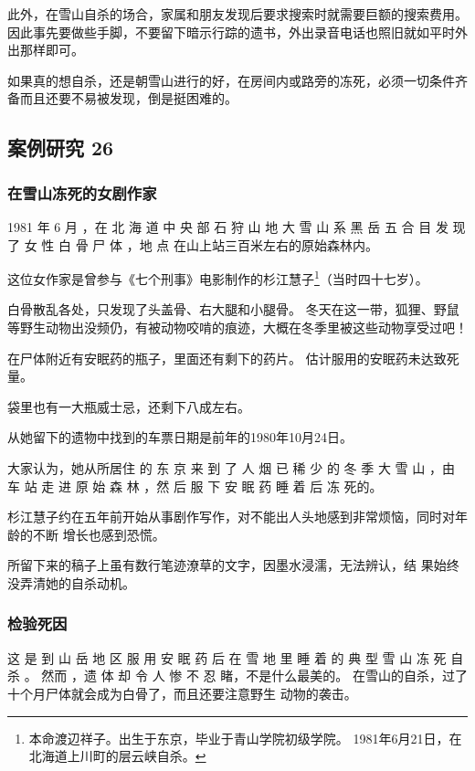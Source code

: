 \documentclass[UTF8]{ctexart}
\begin{document}
此外，在雪山自杀的场合，家属和朋友发现后要求搜索时就需要巨额的搜索费用。因此事先要做些手脚，不要留下暗示行踪的遗书，外出录音电话也照旧就如平时外出那样即可。

如果真的想自杀，还是朝雪山进行的好，在房间内或路旁的冻死，必须一切条件齐备而且还要不易被发现，倒是挺困难的。

\subsection{案例研究 26}

\subsubsection*{在雪山冻死的女剧作家}

1981 年 6 月 ，在 北 海 道 中 央 部 石 狩 山 地 大 雪 山 系 黑 岳 五 合 目 发 现 了 女 性 白 骨 尸 体 ，地 点 在山上站三百米左右的原始森林内。

这位女作家是曾参与《七个刑事》电影制作的杉江慧子\footnote{本命渡辺祥子。出生于东京，毕业于青山学院初级学院。 1981年6月21日，在北海道上川町的层云峡自杀。}（当时四十七岁）。

白骨散乱各处，只发现了头盖骨、右大腿和小腿骨。
冬天在这一带，狐狸、野鼠等野生动物出没频仍，有被动物咬啃的痕迹，大概在冬季里被这些动物享受过吧！

在尸体附近有安眠药的瓶子，里面还有剩下的药片。
估计服用的安眠药未达致死量。

袋里也有一大瓶威士忌，还剩下八成左右。

从她留下的遗物中找到的车票日期是前年的1980年10月24日。

大家认为，她从所居住 的 东 京 来 到 了 人 烟 已 稀 少 的 冬 季 大 雪 山 ，由 车 站 走 进 原 始 森 林 ，然 后 服 下 安 眠 药 睡 着 后 冻 死的。

杉江慧子约在五年前开始从事剧作写作，对不能出人头地感到非常烦恼，同时对年龄的不断 增长也感到恐慌。

所留下来的稿子上虽有数行笔迹潦草的文字，因墨水浸濡，无法辨认，结 果始终没弄清她的自杀动机。

\subsubsection*{检验死因}

这 是 到 山 岳 地 区 服 用 安 眠 药 后 在 雪 地 里 睡 着 的 典 型 雪 山 冻 死 自 杀 。
然而 ，遗 体 却 令 人 惨 不 忍 睹，不是什么最美的。
在雪山的自杀，过了十个月尸体就会成为白骨了，而且还要注意野生 动物的袭击。
\end{document}
